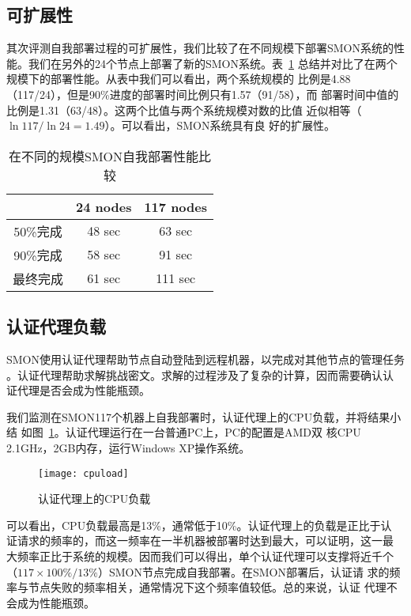 
\subsection{可扩展性}

其次评测自我部署过程的可扩展性，我们比较了在不同规模下部署SMON系统的性
能。我们在另外的24个节点上部署了新的SMON系统。表~\ref{fig:scalability}
总结并对比了在两个规模下的部署性能。从表中我们可以看出，两个系统规模的
比例是4.88（117/24），但是90\%进度的部署时间比例只有1.57（91/58），而
部署时间中值的比例是1.31（63/48）。这两个比值与两个系统规模对数的比值
近似相等（$\ln 117/\ln 24 = 1.49$）。可以看出，SMON系统具有良
好的扩展性。
\begin{table}[htbp]
\centering
  \begin{minipage}{0.8\linewidth}
    \centering
    \caption{在不同的规模SMON自我部署性能比较}
    \label{fig:scalability}
    \begin{tabular}{ccc}
    \toprule[1.5pt]
           & 24 nodes & 117 nodes\\
    \midrule[1pt]
    50\%完成 & 48 sec & 63 sec \\
    90\%完成 & 58 sec & 91 sec\\
    最终完成 & 61 sec & 111 sec\\
    \bottomrule[1.5pt]
    \end{tabular}
  \end{minipage}
\end{table}

\subsection{认证代理负载}

SMON使用认证代理帮助节点自动登陆到远程机器，以完成对其他节点的管理任务
。认证代理帮助求解挑战密文。求解的过程涉及了复杂的计算，因而需要确认认
证代理是否会成为性能瓶颈。

我们监测在SMON117个机器上自我部署时，认证代理上的CPU负载，并将结果小结
如图~\ref{fig:agentload}。认证代理运行在一台普通PC上，PC的配置是AMD双
核CPU 2.1GHz，2GB内存，运行Windows XP操作系统。

\begin{figure}[htbp]
\centering
\texttt{[image: cpuload]}
\caption{认证代理上的CPU负载}
\label{fig:agentload}
\end{figure}

可以看出，CPU负载最高是13\%，通常低于10\%。认证代理上的负载是正比于认
证请求的频率的，而这一频率在一半机器被部署时达到最大，可以证明，这一最
大频率正比于系统的规模。因而我们可以得出，单个认证代理可以支撑将近千个
（$117 \times 100\%/13\%$）SMON节点完成自我部署。在SMON部署后，认证请
求的频率与节点失败的频率相关，通常情况下这个频率值较低。总的来说，认证
代理不会成为性能瓶颈。

